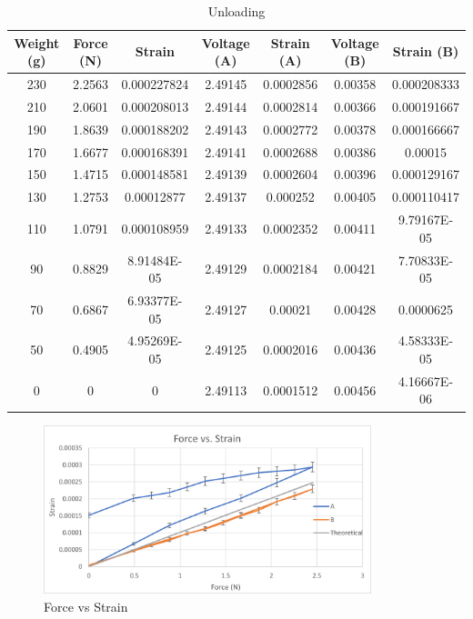 \documentclass{article}
\begin{document}
\begin{table}[ht]
    \centering
    \caption{Unloading}
    \begin{tabular}{|c|c|c|c|c|c|c|}
    \hline
    Weight (g) & Force (N) & Strain & Voltage (A) & Strain (A) & Voltage (B) & Strain (B) \\ \hline 
    230 & 2.2563 & 0.000227824 & 2.49145 & 0.0002856 & 0.00358 & 0.000208333 \\ \hline
    210 & 2.0601 & 0.000208013 & 2.49144 & 0.0002814 & 0.00366 & 0.000191667 \\ \hline
    190 & 1.8639 & 0.000188202 & 2.49143 & 0.0002772 & 0.00378 & 0.000166667 \\ \hline
    170 & 1.6677 & 0.000168391 & 2.49141 & 0.0002688 & 0.00386 & 0.00015 \\ \hline
    150 & 1.4715 & 0.000148581 & 2.49139 & 0.0002604 & 0.00396 & 0.000129167 \\ \hline
    130 & 1.2753 & 0.00012877  & 2.49137 & 0.000252  & 0.00405 & 0.000110417 \\ \hline
    110 & 1.0791 & 0.000108959 & 2.49133 & 0.0002352 & 0.00411 & 9.79167E-05 \\ \hline
    90  & 0.8829 & 8.91484E-05 & 2.49129 & 0.0002184 & 0.00421 & 7.70833E-05 \\ \hline
    70  & 0.6867 & 6.93377E-05 & 2.49127 & 0.00021   & 0.00428 & 0.0000625  \\ \hline
    50  & 0.4905 & 4.95269E-05 & 2.49125 & 0.0002016 & 0.00436 & 4.58333E-05 \\ \hline
    0   & 0      & 0           & 2.49113 & 0.0001512 & 0.00456 & 4.16667E-06 \\ \hline
    \end{tabular}
    \label{tab:unloading}
\end{table}


\begin{figure}[H]
    \centering
    \includegraphics[width = 0.85\textwidth]{lab5images/ForcevsStrain.png}
    \caption{Force vs Strain}
    \label{fig:forcevsstrain}
\end{figure}
\end{document}
